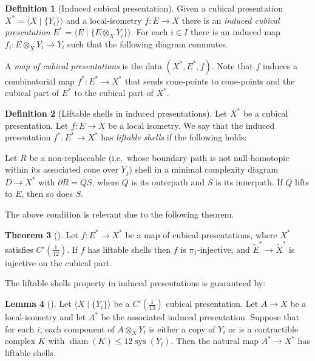 \documentclass[12pt,oneside]{amsart}
\theoremstyle{definition}
\newtheorem{thm}{Theorem}[section]
\newtheorem{lem}[thm]{Lemma}
\theoremstyle{definition}
\newtheorem{defn}[thm]{Definition}
\newtheorem{definition}[thm]{Definition}
\theoremstyle{remark}
\DeclareMathOperator{\diam}{\text{diam}}
\DeclareMathOperator{\sys}{\mathrm sys}
\begin{document}
\begin{defn}[Induced cubical presentation]
\label{def:induced presentation}
Given a cubical presentation $X^*=\langle X \mid \{Y_i\}\rangle$ and a local-isometry $f:E\rightarrow X$ there is an \emph{induced cubical presentation}
$E^*=\langle E \mid \{E\otimes_X Y_i\} \rangle$. 
For each $i \in I$ there is an induced map $f_i: E\otimes_X Y_i \rightarrow Y_i$ such that the following diagram commutes.

\begin{center}
\end{center}

A \emph{map of cubical presentations} is the data $(X^*, E^*, f)$. Note that $f$ induces a combinatorial map $f^*:E^* \rightarrow X^*$ that sends  cone-points to cone-points and the cubical part of $E^*$ to the cubical part of $X^*$.

\end{defn}

\begin{definition}[Liftable shells in induced presentations]\label{def:nomissingshells}
    Let $X^*$ be a cubical  presentation. Let $f:E\to X$ be a local isometry. We say that the induced presentation $f^*:E^* \rightarrow X^*$ has \emph{liftable shells} if the following holds:
    
    Let $R$ be a non-replaceable (i.e.\ whose boundary path is not null-homotopic within its associated cone over $Y_j$)
    shell in a minimal complexity diagram $D\rightarrow X^*$ with $\partial R = QS$, where $Q$ is its outerpath and $S$ is its innerpath.
    If $Q$ lifts to $E$, then so does $S$.
\end{definition}

The above condition is relevant due to the following theorem.

\begin{thm}[{\cite[Thm~3.68]{WiseBook}}]\label{thm:no_missing_shells_injective}
     Let $f: E^* \rightarrow X^*$ be a map of cubical presentations, where $X^*$ satisfies $C'(\frac 1 {12})$. If $f$ has liftable shells then $f$ is $\pi_1$-injective, and $\widetilde E^*\to \widetilde X^*$ is injective on the cubical part.
\end{thm}


The liftable shells property in induced presentations is guaranteed by:
\begin{lem}[{\cite[Lem~3.67]{WiseBook}}]\label{lem:liftable shells condition}
Let $ \langle X \mid \{Y_i\} \rangle$  be a $C'(\frac{1}{14})$ cubical presentation. Let $A \rightarrow X$ be a local-isometry and let $A^*$ be the associated induced presentation. Suppose that for each $i$, each component of $A \otimes_X Y_i$ is either a copy of $Y_i$ or is a contractible complex $K$ with $\diam(K) \leq 12 \sys(Y_i)$. Then the natural map $A^* \rightarrow X^*$ has liftable shells.
\end{lem}
\end{document}
